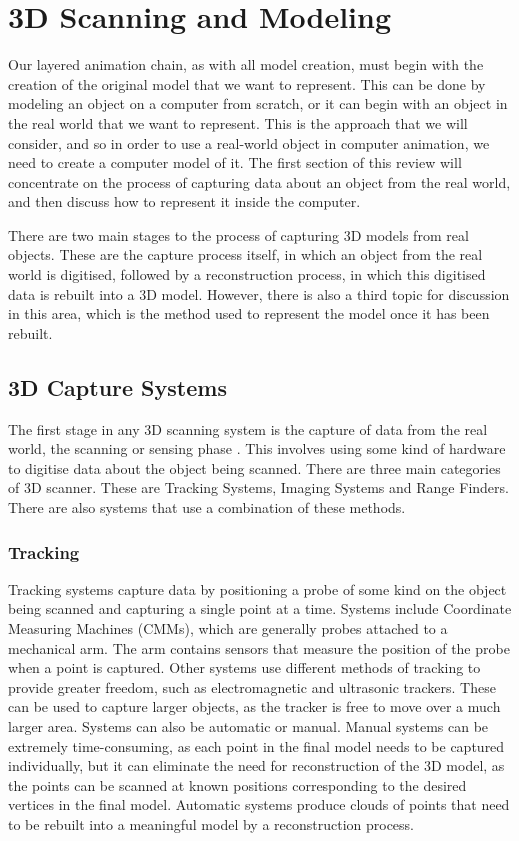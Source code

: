 \documentclass[10pt,oneside,fleqn,a4paper]{book}
\begin{document}
\section{\label{sec:reviewscanning}3D Scanning and Modeling}
Our layered animation chain, as with all model creation, must begin with the creation of the original model that we want to represent. This can be done by modeling an object on a computer from scratch, or it can begin with an object in the real world that we want to represent. This is the approach that we will consider, and so in order to use a real-world object in computer animation, we need to create a computer model of it. The first section of this review will concentrate on the process of capturing data about an object from the real world, and then discuss how to represent it inside the computer.

There are two main stages to the process of capturing 3D models from real objects. These are the capture process itself, in which an object from the real world is digitised, followed by a reconstruction process, in which this digitised data is rebuilt into a 3D model. However, there is also a third topic for discussion in this area, which is the method used to represent the model once it has been rebuilt.

\subsection{\label{sec:reviewcapture}3D Capture Systems}
The first stage in any 3D scanning system is the capture of data from the real world, the scanning or sensing phase \cite{Isdale98}. This involves using some kind of hardware to digitise data about the object being scanned. There are three main categories of 3D scanner. These are Tracking Systems, Imaging Systems and Range Finders. There are also systems that use a combination of these methods.

\subsubsection{Tracking}
Tracking systems capture data by positioning a probe of some kind on the object being scanned and capturing a single point at a time. Systems include Coordinate Measuring Machines (CMMs), which are generally probes attached to a mechanical arm. The arm contains sensors that measure the position of the probe when a point is captured. Other systems use different methods of tracking to provide greater freedom, such as electromagnetic and ultrasonic trackers. These can be used to capture larger objects, as the tracker is free to move over a much larger area. Systems can also be automatic or manual. Manual systems can be extremely time-consuming, as each point in the final model needs to be captured individually, but it can eliminate the need for reconstruction of the 3D model, as the points can be scanned at known positions corresponding to the desired vertices in the final model. Automatic systems produce clouds of points that need to be rebuilt into a meaningful model by a reconstruction process.
\end{document}
